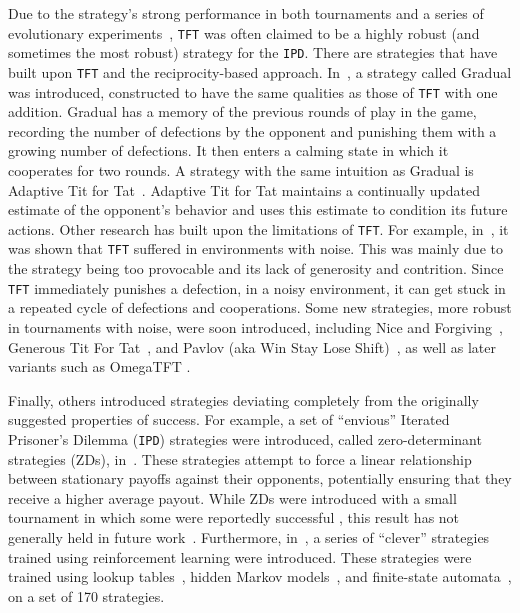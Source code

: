 \documentclass{article}
\def\TFT{\texttt{TFT}}
\def\IPD{\texttt{IPD}}
\begin{document}
Due to the strategy's strong performance in both tournaments and a series of
evolutionary experiments~\cite{Axelrod1981}, \TFT{} was often claimed to be a
highly robust (and sometimes the most robust) strategy for the \IPD.
There are strategies that have built upon \TFT{} and the reciprocity-based
approach. In~\cite{Beaufils1997}, a strategy called Gradual was introduced,
constructed to have the same qualities as those of \TFT{} with one
addition. Gradual has a memory of the previous rounds of play in the game,
recording the number of defections by the opponent and punishing them with a
growing number of defections. It then enters a calming state in which it
cooperates for two rounds. A strategy with the same intuition as Gradual is
Adaptive Tit for Tat~\cite{tzafestas-2000a}. Adaptive Tit for Tat maintains a
continually updated estimate of the opponent's behavior and uses this estimate
to condition its future actions.
Other research has built upon the limitations of \TFT. For example,
in~\cite{Bendor1991, Donninger1986, Molander1985, Hammerstein1984}, it was shown
that \TFT{} suffered in environments with noise. This was mainly due to the
strategy being too provocable and its lack of generosity and contrition. Since
\TFT{} immediately punishes a defection, in a noisy environment, it can get
stuck in a repeated cycle of defections and cooperations. Some new strategies,
more robust in tournaments with noise, were soon introduced, including Nice and
Forgiving~\cite{Bendor1991}, Generous Tit For Tat~\cite{Nowak1992}, and Pavlov
(aka Win Stay Lose Shift)~\cite{Nowak1993}, as well as later variants such as
OmegaTFT \cite{kendall2007iterated}.

Finally, others introduced strategies deviating completely from the originally
suggested properties of success. For example, a set of ``envious'' Iterated
Prisoner's Dilemma (\IPD) strategies were introduced, called zero-determinant
strategies (ZDs), in~\cite{Press2012}. These strategies attempt to force a
linear relationship between stationary payoffs against their
opponents, potentially ensuring that they receive a higher average payout. While
ZDs were introduced with a small tournament in which some were reportedly
successful \cite{Stewart2012}, this result has not generally held in future
work~\cite{mathieu2017}. Furthermore, in~\cite{Harper2017}, a series of ``clever''
strategies trained using reinforcement learning were introduced. These
strategies were trained using lookup tables~\cite{Axelrod1987}, hidden Markov
models~\cite{Harper2017}, and finite-state automata~\cite{Miller1996}, on
a set of 170 strategies.
\end{document}
